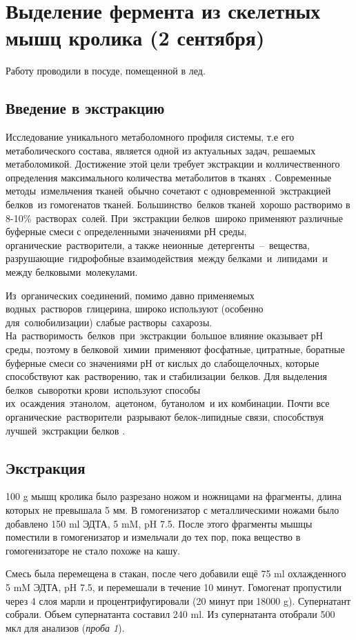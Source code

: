 \section{Выделение фермента из скелетных мышц кролика (2 сентября)}
Работу проводили в посуде, помещенной в лед.

\subsection{Введение в экстракцию}
Исследование уникального метаболомного профиля системы, т.е его метаболического состава, является одной из
актуальных задач, решаемых метаболомикой.
Достижение этой цели требует экстракции и колличественного определения максимального количества
метаболитов в тканях \cite{kursovaya-garika}.
Современные методы измельчения тканей обычно сочетают с одновременной экстракцией белков из гомогенатов
тканей.
Большинство белков тканей хорошо растворимо в 8-10\% растворах солей.
При экстракции белков широко применяют различные буферные смеси с определенными значениями рН среды,
органические растворители, а также неионные детергенты -- вещества, разрушающие гидрофобные
взаимодействия между белками и липидами и между белковыми молекулами.

Из органических соединений, помимо давно применяемых водных растворов глицерина, широко используют
(особенно для солюбилизации) слабые растворы сахарозы.
На растворимость белков при экстракции большое влияние оказывает рН среды, поэтому в
белковой химии применяют фосфатные, цитратные, боратные буферные смеси со значениями рН от кислых до
слабощелочных, которые способствуют как растворению, так и стабилизации белков.
Для выделения белков сыворотки крови используют способы их осаждения этанолом, ацетоном, бутанолом и их
комбинации.
Почти все органические растворители разрывают белок-липидные связи, способствуя лучшей экстракции
белков \cite{berezov}.

\subsection{Экстракция}
100 g мышц кролика было разрезано ножом и ножницами на фрагменты,
длина которых не превышала 5 мм.
В гомогенизатор с металлическими ножами было добавлено 150 ml ЭДТА, 5 mM, pH 7.5.
После этого фрагменты мышцы поместили в гомогенизатор и измельчали до тех пор,
пока вещество в гомогенизаторе не стало похоже на кашу.

Смесь была перемещена в стакан, после чего добавили ещё 75 ml охлажденного 5 mM ЭДТА, pH 7.5,
и перемешали в течение 10 минут.
Гомогенат пропустили через 4 слоя марли и процентрифугировали (20 минут при 18000 g).
Супернатант собрали. Объем супернатанта составил 240 ml.
Из супернатанта отобрали 500 мкл для анализов (\emph{проба 1}).

